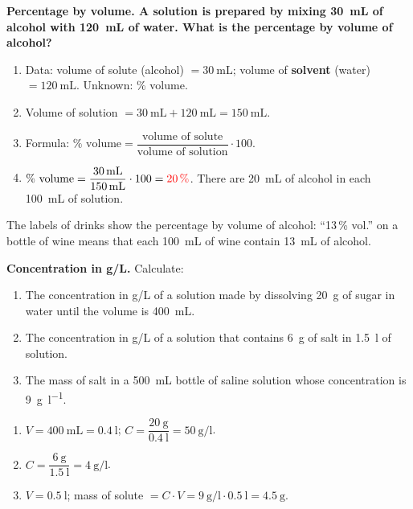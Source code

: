\begin{example}
    \textbf{Percentage by volume. A solution is prepared by mixing \qty{30}{\mL} of alcohol with \qty{120}{\mL} of water. What is the percentage by volume of alcohol?}
    \begin{enumerate}[label=\numberballmDarkTeal]
        \item Data: volume of solute (alcohol) \(= \qty{30}{\mL}\); volume of \textbf{solvent} (water) \(= \qty{120}{\mL}\). Unknown: \% volume.
        \item Volume of solution \(= \qty{30}{\mL} + \qty{120}{\mL} = \qty{150}{\mL}\).
        \item Formula: \(\%\text{ volume} = \dfrac{\text{volume of solute}}{\text{volume of solution}} \cdot 100\).
        \item \(\%\text{ volume} = \dfrac{\qty{30}{\mL}}{\qty{150}{\mL}} \cdot 100 = \textcolor{red}{\qty{20}{\percent}}\). There are \qty{20}{\mL} of alcohol in each \qty{100}{\mL} of solution.
    \end{enumerate}
\end{example}

\begin{didyouknow}
    The labels of drinks show the percentage by volume of alcohol: ``13\,\% vol.'' on a bottle of wine means that each \qty{100}{\mL} of wine contain \qty{13}{\mL} of alcohol.
\end{didyouknow}

\begin{exercise}
    \textbf{Concentration in g/L.} Calculate:
    \begin{enumerate}[label=\letraminuscula]
        \item The concentration in g/L of a solution made by dissolving \qty{20}{\g} of sugar in water until the volume is \qty{400}{\mL}.
        \item The concentration in g/L of a solution that contains \qty{6}{\g} of salt in \qty{1.5}{\litre} of solution.
        \item The mass of salt in a \qty{500}{\mL} bottle of saline solution whose concentration is \qty{9}{\g\per\litre}.
    \end{enumerate}
    \begin{solu}
        \begin{enumerate}[label=\alph*)]
            \item \(V = \qty{400}{\mL} = \qty{0.4}{\litre}\); \(C = \dfrac{\qty{20}{\g}}{\qty{0.4}{\litre}} = \qty{50}{\g\per\litre}\).
            \item \(C = \dfrac{\qty{6}{\g}}{\qty{1.5}{\litre}} = \qty{4}{\g\per\litre}\).
            \item \(V = \qty{0.5}{\litre}\); mass of solute \(= C \cdot V = \qty{9}{\g\per\litre} \cdot \qty{0.5}{\litre} = \qty{4.5}{\g}\).
        \end{enumerate}
    \end{solu}
\end{exercise}

